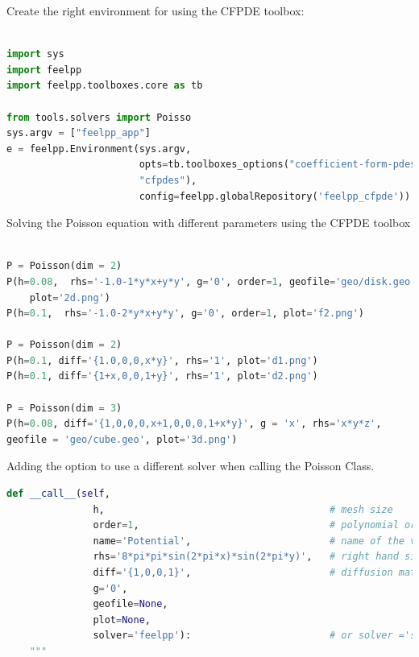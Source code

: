 \documentclass[12pt]{article}
\begin{document}
\begin{enumerate}
Create the right environment for using the CFPDE toolbox:
\begin{lstlisting}[language=python,caption={},frame=single, backgroundcolor=\color{gray!10}, basicstyle=\footnotesize,rulecolor=\color{blue}, framexleftmargin=3pt, commentstyle=\color{mygreen}, keywordstyle=\color{blue}]

import sys
import feelpp
import feelpp.toolboxes.core as tb

from tools.solvers import Poisso
sys.argv = ["feelpp_app"]
e = feelpp.Environment(sys.argv,
                       opts=tb.toolboxes_options("coefficient-form-pdes", 
                       "cfpdes"),
                       config=feelpp.globalRepository('feelpp_cfpde'))

\end{lstlisting}

Solving the Poisson equation with different parameters using the CFPDE toolbox

\begin{lstlisting}[language=Python,caption={},frame=single, backgroundcolor=\color{gray!10}, basicstyle=\footnotesize,rulecolor=\color{blue}, framexleftmargin=3pt, commentstyle=\color{mygreen}, keywordstyle=\color{blue}]

P = Poisson(dim = 2)
P(h=0.08,  rhs='-1.0-1*y*x+y*y', g='0', order=1, geofile='geo/disk.geo',
    plot='2d.png')
P(h=0.1,  rhs='-1.0-2*y*x+y*y', g='0', order=1, plot='f2.png')

P = Poisson(dim = 2)
P(h=0.1, diff='{1.0,0,0,x*y}', rhs='1', plot='d1.png')
P(h=0.1, diff='{1+x,0,0,1+y}', rhs='1', plot='d2.png')

P = Poisson(dim = 3)
P(h=0.08, diff='{1,0,0,0,x+1,0,0,0,1+x*y}', g = 'x', rhs='x*y*z', 
geofile = 'geo/cube.geo', plot='3d.png') 

\end{lstlisting}

Adding the option to use a different solver when calling the Poisson Class.
\begin{lstlisting}[language=Python,caption={},frame=single, backgroundcolor=\color{gray!10}, basicstyle=\footnotesize,rulecolor=\color{blue}, framexleftmargin=3pt, commentstyle=\color{mygreen}, keywordstyle=\color{blue}]
def __call__(self,
               h,                                       # mesh size 
               order=1,                                 # polynomial order 
               name='Potential',                        # name of the variable
               rhs='8*pi*pi*sin(2*pi*x)*sin(2*pi*y)',   # right hand side
               diff='{1,0,0,1}',                        # diffusion matrix
               g='0',
               geofile=None,
               plot=None,
               solver='feelpp'):                        # or solver ='scimba'
    """
\end{lstlisting}


\end{enumerate}
\end{document}
